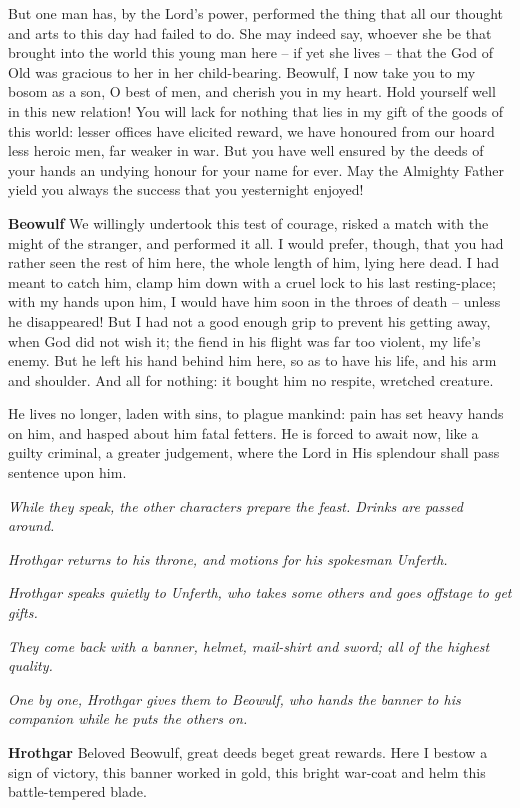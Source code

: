 \documentclass[a4paper]{article}
\begin{document}
{But one man has,
by the Lord’s power, performed the thing
that all our thought and arts to this day
had failed to do. She may indeed say,
whoever she be that brought into the world
this young man here – if yet she lives –
that the God of Old was gracious to her
in her child-bearing. Beowulf, I now take you
to my bosom as a son, O best of men,
and cherish you in my heart. Hold yourself well
in this new relation! You will lack for nothing
that lies in my gift of the goods of this world:
lesser offices have elicited reward,
we have honoured from our hoard less heroic men,
far weaker in war. But you have well ensured
by the deeds of your hands an undying honour
for your name for ever. May the Almighty Father
yield you always the success that you yesternight enjoyed!

\textbf{Beowulf} We willingly undertook this test of courage,
risked a match with the might of the stranger,
and performed it all. I would prefer, though,
that you had rather seen the rest of him here,
the whole length of him, lying here dead.
I had meant to catch him, clamp him down
with a cruel lock to his last resting-place;
with my hands upon him, I would have him soon
in the throes of death – unless he disappeared!
But I had not a good enough grip to prevent
his getting away, when God did not wish it;
the fiend in his flight was far too violent,
my life’s enemy. But he left his hand
behind him here, so as to have his life,
and his arm and shoulder. And all for nothing:
it bought him no respite, wretched creature.

He lives no longer, laden with sins,
to plague mankind: pain has set
heavy hands on him, and hasped about him
fatal fetters. He is forced to await now,
like a guilty criminal, a greater judgement,
where the Lord in His splendour shall pass sentence upon him.

\centerline{\textit{While they speak, the other characters prepare the feast. Drinks are passed around.}}
\centerline{\textit{Hrothgar returns to his throne, and motions for his spokesman Unferth.}}

\centerline{\textit{Hrothgar speaks quietly to Unferth, who takes some others and goes offstage to get gifts.}}
\centerline{\textit{They come back with a banner, helmet, mail-shirt and sword; all of the highest quality.}}
\centerline{\textit{One by one, Hrothgar gives them to Beowulf, who hands the banner to his companion while he puts the others on.}}

\textbf{Hrothgar} Beloved Beowulf,
great deeds beget great rewards. 
Here I bestow a sign of victory,
this banner worked in gold,
this bright war-coat and helm
this battle-tempered blade.

}
\end{document}
